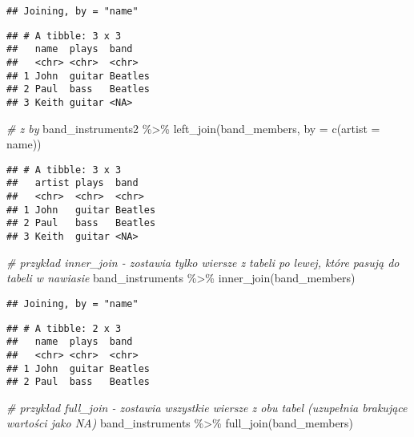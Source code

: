 \documentclass[
]{book}
\newenvironment{Shaded}{\begin{snugshade}}{\end{snugshade}}
\newcommand{\AttributeTok}[1]{\textcolor[rgb]{0.77,0.63,0.00}{#1}}
\newcommand{\CommentTok}[1]{\textcolor[rgb]{0.56,0.35,0.01}{\textit{#1}}}
\newcommand{\FunctionTok}[1]{\textcolor[rgb]{0.00,0.00,0.00}{#1}}
\newcommand{\NormalTok}[1]{#1}
\newcommand{\OtherTok}[1]{\textcolor[rgb]{0.56,0.35,0.01}{#1}}
\newcommand{\SpecialCharTok}[1]{\textcolor[rgb]{0.00,0.00,0.00}{#1}}
\newcommand{\StringTok}[1]{\textcolor[rgb]{0.31,0.60,0.02}{#1}}
\begin{document}
\begin{verbatim}
## Joining, by = "name"
\end{verbatim}

\begin{verbatim}
## # A tibble: 3 x 3
##   name  plays  band   
##   <chr> <chr>  <chr>  
## 1 John  guitar Beatles
## 2 Paul  bass   Beatles
## 3 Keith guitar <NA>
\end{verbatim}

\begin{Shaded}
\begin{Highlighting}[]
\CommentTok{\# z by}
\NormalTok{band\_instruments2 }\SpecialCharTok{\%\textgreater{}\%} \FunctionTok{left\_join}\NormalTok{(band\_members, }\AttributeTok{by =} \FunctionTok{c}\NormalTok{(}\StringTok{\textquotesingle{}artist\textquotesingle{}} \OtherTok{=} \StringTok{\textquotesingle{}name\textquotesingle{}}\NormalTok{))}
\end{Highlighting}
\end{Shaded}

\begin{verbatim}
## # A tibble: 3 x 3
##   artist plays  band   
##   <chr>  <chr>  <chr>  
## 1 John   guitar Beatles
## 2 Paul   bass   Beatles
## 3 Keith  guitar <NA>
\end{verbatim}

\begin{Shaded}
\begin{Highlighting}[]
\CommentTok{\# przykład inner\_join {-} zostawia tylko wiersze z tabeli po lewej, które pasują do tabeli w nawiasie}
\NormalTok{band\_instruments }\SpecialCharTok{\%\textgreater{}\%} \FunctionTok{inner\_join}\NormalTok{(band\_members)}
\end{Highlighting}
\end{Shaded}

\begin{verbatim}
## Joining, by = "name"
\end{verbatim}

\begin{verbatim}
## # A tibble: 2 x 3
##   name  plays  band   
##   <chr> <chr>  <chr>  
## 1 John  guitar Beatles
## 2 Paul  bass   Beatles
\end{verbatim}

\begin{Shaded}
\begin{Highlighting}[]
\CommentTok{\# przykład full\_join {-} zostawia wszystkie wiersze z obu tabel (uzupełnia brakujące wartości jako NA)}
\NormalTok{band\_instruments }\SpecialCharTok{\%\textgreater{}\%} \FunctionTok{full\_join}\NormalTok{(band\_members)}
\end{Highlighting}
\end{Shaded}
\end{document}
